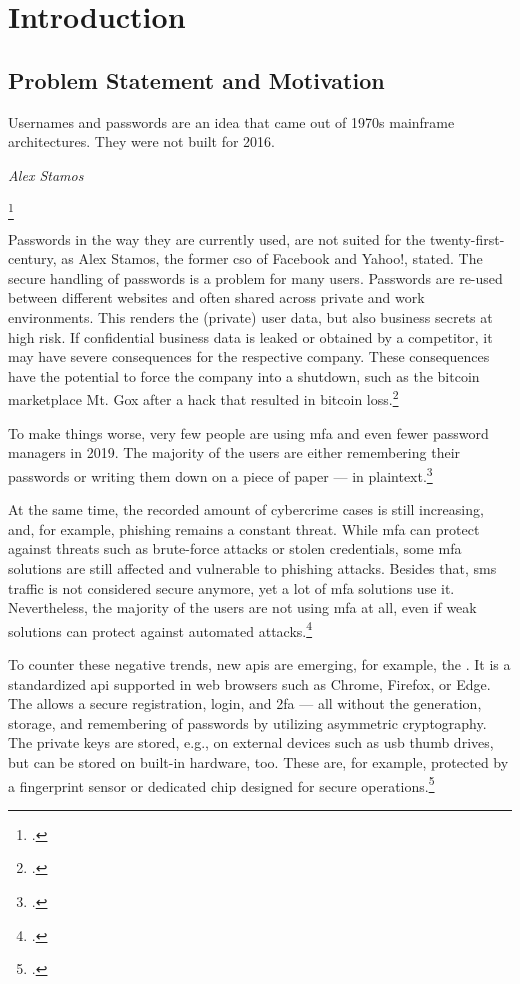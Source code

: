 \chapter{Introduction}
\label{chapter:introduction}

\section{Problem Statement and Motivation}

\setlength{}
\epigraph{\frqq Usernames and passwords are an idea that came out of 1970s mainframe architectures. They were not built for 2016.\flqq\footnotemark}{\textit{Alex Stamos}}
\footcitetext{stamos}

Passwords in the way they are currently used, are not suited for the twenty-first-century, as Alex Stamos, the former \gls{cso} of Facebook and Yahoo!, stated. The secure handling of passwords is a problem for many users. Passwords are re-used between different websites and often shared across private and work environments. This renders the (private) user data, but also business secrets at high risk. If confidential business data is leaked or obtained by a competitor, it may have severe consequences for the respective company. These consequences have the potential to force the company into a shutdown, such as the bitcoin marketplace Mt. Gox after a hack that resulted in bitcoin loss.\footcites[See][43]{rosenberger2018bitcoin}

To make things worse, very few people are using \gls{mfa} and even fewer password managers in 2019. The majority of the users are either remembering their passwords or writing them down on a piece of paper --- in plaintext.\footcites[See][]{ibm-security}[See][]{web-de-passwords}

At the same time, the recorded amount of cybercrime cases is still increasing, and, for example, phishing remains a constant threat. While \gls{mfa} can protect against threats such as brute-force attacks or stolen credentials, some \gls{mfa} solutions are still affected and vulnerable to phishing attacks. Besides that, \gls{sms} traffic is not considered secure anymore, yet a lot of \gls{mfa} solutions use it. Nevertheless, the majority of the users are not using \gls{mfa} at all, even if weak solutions can protect against automated attacks.\footcites[See][]{infratest-dimap}[See][6--7]{bka-cybercrime}[See][58]{dotson2019practical}[See][2]{Doerfler:2019:ELC:3308558.3313481}

To counter these negative trends, new \glspl{api} are emerging, for example, the \wa. It is a standardized \gls{api} supported in web browsers such as Chrome, Firefox, or Edge. The \wa{} allows a secure registration, login, and \gls{2fa} --- all without the generation, storage, and remembering of passwords by utilizing asymmetric cryptography. The private keys are stored, e.g., on external devices such as \gls{usb} thumb drives, but can be stored on built-in hardware, too. These are, for example, protected by a fingerprint sensor or dedicated chip designed for secure operations.\footcites[See][Chapter 1]{w3c}

